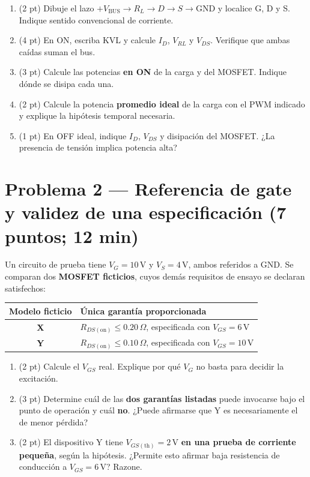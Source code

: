 \documentclass[11pt, a4paper]{article}
\begin{document}
\begin{enumerate}[label=\arabic*., noitemsep, topsep=3pt]
    \item (2 pt) Dibuje el lazo $+V_{\text{BUS}} \rightarrow R_L \rightarrow D \rightarrow S \rightarrow \text{GND}$ y localice G, D y S. Indique sentido convencional de corriente.
    \item (4 pt) En ON, escriba KVL y calcule $I_D$, $V_{RL}$ y $V_{DS}$. Verifique que ambas caídas suman el bus.
    \item (3 pt) Calcule las potencias \textbf{en ON} de la carga y del MOSFET. Indique dónde se disipa cada una.
    \item (2 pt) Calcule la potencia \textbf{promedio ideal} de la carga con el PWM indicado y explique la hipótesis temporal necesaria.
    \item (1 pt) En OFF ideal, indique $I_D$, $V_{DS}$ y disipación del MOSFET. ¿La presencia de tensión implica potencia alta?
\end{enumerate}

\section*{Problema 2 — Referencia de gate y validez de una especificación (7 puntos; 12 min)}

Un circuito de prueba tiene $V_G = 10\,\text{V}$ y $V_S = 4\,\text{V}$, ambos referidos a GND. Se comparan dos \textbf{MOSFET ficticios}, cuyos demás requisitos de ensayo se declaran satisfechos:

\begin{center}
\renewcommand{\arraystretch}{1.25}
\begin{tabularx}{0.82\linewidth}{|c|>{\raggedright\arraybackslash}X|}
\hline
\rowcolor{ucbgray}
\textbf{Modelo ficticio} & \textbf{Única garantía proporcionada} \\ \hline
\textbf{X} & $R_{DS(\text{on})} \le 0.20\,\Omega$, especificada con $V_{GS} = 6\,\text{V}$ \\ \hline
\textbf{Y} & $R_{DS(\text{on})} \le 0.10\,\Omega$, especificada con $V_{GS} = 10\,\text{V}$ \\ \hline
\end{tabularx}
\end{center}

\begin{enumerate}[label=\arabic*., noitemsep, topsep=3pt]
    \item (2 pt) Calcule el $V_{GS}$ real. Explique por qué $V_G$ no basta para decidir la excitación.
    \item (3 pt) Determine cuál de las \textbf{dos garantías listadas} puede invocarse bajo el punto de operación y cuál \textbf{no}. ¿Puede afirmarse que Y es necesariamente el de menor pérdida?
    \item (2 pt) El dispositivo Y tiene $V_{GS(\text{th})} = 2\,\text{V}$ \textbf{en una prueba de corriente pequeña}, según la hipótesis. ¿Permite esto afirmar baja resistencia de conducción a $V_{GS} = 6\,\text{V}$? Razone.
\end{enumerate}
\end{document}
